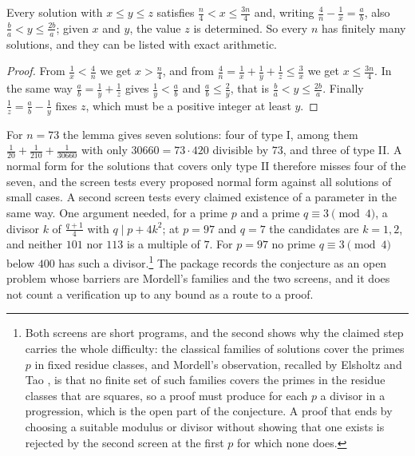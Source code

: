 \begin{lemma}\label{lem:egyptian}
Every solution with $x\le y\le z$ satisfies $\frac n4<x\le\frac{3n}{4}$ and, writing $\frac4n-\frac1x=\frac ab$, also $\frac ba<y\le\frac{2b}{a}$; given $x$ and $y$, the value $z$ is determined. So every $n$ has finitely many solutions, and they can be listed with exact arithmetic.
\end{lemma}

\begin{proof}
From $\frac1x<\frac4n$ we get $x>\frac n4$, and from $\frac4n=\frac1x+\frac1y+\frac1z\le\frac3x$ we get $x\le\frac{3n}{4}$. In the same way $\frac ab=\frac1y+\frac1z$ gives $\frac1y<\frac ab$ and $\frac ab\le\frac2y$, that is $\frac ba<y\le\frac{2b}a$. Finally $\frac1z=\frac ab-\frac1y$ fixes $z$, which must be a positive integer at least $y$.
\end{proof}

For $n=73$ the lemma gives seven solutions: four of type I, among them $\frac1{20}+\frac1{210}+\frac1{30660}$ with only $30660=73\cdot420$ divisible by $73$, and three of type II. A normal form for the solutions that covers only type II therefore misses four of the seven, and the screen tests every proposed normal form against all solutions of small cases. A second screen tests every claimed existence of a parameter in the same way. One argument needed, for a prime $p$ and a prime $q\equiv3\pmod4$, a divisor $k$ of $\frac{q+1}{4}$ with $q\mid p+4k^{2}$; at $p=97$ and $q=7$ the candidates are $k=1,2$, and neither $101$ nor $113$ is a multiple of $7$. For $p=97$ no prime $q\equiv3\pmod4$ below $400$ has such a divisor.\footnote{Both screens are short programs, and the second shows why the claimed step carries the whole difficulty: the classical families of solutions cover the primes $p$ in fixed residue classes, and Mordell's observation, recalled by Elsholtz and Tao \cite{ET13}, is that no finite set of such families covers the primes in the residue classes that are squares, so a proof must produce for each $p$ a divisor in a progression, which is the open part of the conjecture. A proof that ends by choosing a suitable modulus or divisor without showing that one exists is rejected by the second screen at the first $p$ for which none does.} The package records the conjecture as an open problem whose barriers are Mordell's families and the two screens, and it does not count a verification up to any bound as a route to a proof.

